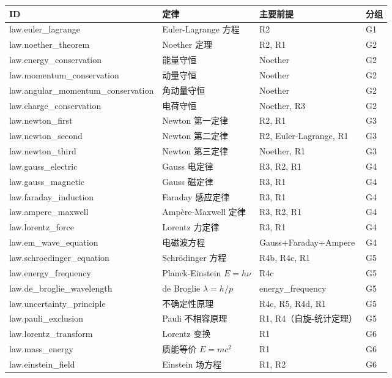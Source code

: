 \documentclass[11pt,a4paper,openany]{book}
\begin{document}
\begin{center}
\footnotesize
\begin{longtable}{>{\ttfamily\footnotesize}p{2.5cm}p{3.5cm}p{4.5cm}p{4.5cm}}
\toprule
\textbf{ID} & \textbf{定律} & \textbf{主要前提} & \textbf{分组} \\
\midrule
law.euler\_lagrange & Euler-Lagrange 方程 & R2 & G1 \\
law.noether\_theorem & Noether 定理 & R2, R1 & G2 \\
law.energy\_conservation & 能量守恒 & Noether & G2 \\
law.momentum\_conservation & 动量守恒 & Noether & G2 \\
law.angular\_momentum\_conservation & 角动量守恒 & Noether & G2 \\
law.charge\_conservation & 电荷守恒 & Noether, R3 & G2 \\
law.newton\_first & Newton 第一定律 & R2, R1 & G3 \\
law.newton\_second & Newton 第二定律 & R2, Euler-Lagrange, R1 & G3 \\
law.newton\_third & Newton 第三定律 & Noether, R1 & G3 \\
\midrule
law.gauss\_electric & Gauss 电定律 & R3, R2, R1 & G4 \\
law.gauss\_magnetic & Gauss 磁定律 & R3, R1 & G4 \\
law.faraday\_induction & Faraday 感应定律 & R3, R1 & G4 \\
law.ampere\_maxwell & Ampère-Maxwell 定律 & R3, R2, R1 & G4 \\
law.lorentz\_force & Lorentz 力定律 & R3, R1 & G4 \\
law.em\_wave\_equation & 电磁波方程 & Gauss+Faraday+Ampere & G4 \\
\midrule
law.schroedinger\_equation & Schrödinger 方程 & R4b, R4c, R1 & G5 \\
law.energy\_frequency & Planck-Einstein $E=h\nu$ & R4c & G5 \\
law.de\_broglie\_wavelength & de Broglie $\lambda=h/p$ & energy\_frequency & G5 \\
law.uncertainty\_principle & 不确定性原理 & R4c, R5, R4d, R1 & G5 \\
law.pauli\_exclusion & Pauli 不相容原理 & R1, R4（自旋-统计定理） & G5 \\
\midrule
law.lorentz\_transform & Lorentz 变换 & R1 & G6 \\
law.mass\_energy & 质能等价 $E=mc^2$ & R1 & G6 \\
law.einstein\_field & Einstein 场方程 & R1, R2 & G6 \\

\end{longtable}
\end{center}
\end{document}
